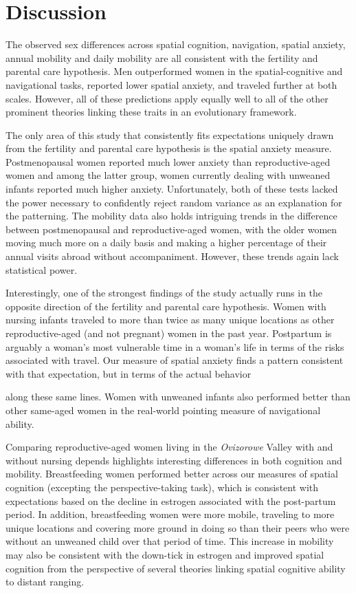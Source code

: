 \section{Discussion}
\label{sec:4}

The observed sex differences across spatial cognition, navigation, spatial anxiety, annual mobility and daily mobility are all consistent with the fertility and parental care hypothesis.  Men outperformed women in the spatial-cognitive and navigational tasks, reported lower spatial anxiety, and traveled further at both scales.  However, all of these predictions apply equally well to all of the other prominent theories linking these traits in an evolutionary framework.  

The only area of this study that consistently fits expectations uniquely drawn from the fertility and parental care hypothesis is the spatial anxiety measure.  Postmenopausal women reported much lower anxiety than reproductive-aged women and among the latter group, women currently dealing with unweaned infants reported much higher anxiety.  Unfortunately, both of these tests lacked the power necessary to confidently reject random variance as an explanation for the patterning.  The mobility data also holds intriguing trends in the difference between postmenopausal and reproductive-aged women, with the older women moving much more on a daily basis and making a higher percentage of their annual visits abroad without accompaniment.  However, these trends again lack statistical power.

Interestingly, one of the strongest findings of the study actually runs in the opposite direction of the fertility and parental care hypothesis.  Women with nursing infants traveled to more than twice as many unique locations as other reproductive-aged (and not pregnant) women in the past year.  Postpartum is arguably a woman's most vulnerable time in a woman's life in terms of the risks associated with travel.  Our measure of spatial anxiety finds a pattern consistent with that expectation, but in terms of the actual behavior   

along these same lines.  Women with unweaned infants also performed better than other same-aged women in the real-world pointing measure of navigational ability.

Comparing reproductive-aged women living in the \emph{Ovizorowe} Valley with and without nursing depends highlights interesting differences in both cognition and mobility.  Breastfeeding women performed better across our measures of spatial cognition (excepting the perspective-taking task), which is consistent with expectations based on the decline in estrogen associated with the post-partum period.  In addition, breastfeeding women were more mobile, traveling to more unique locations and covering more ground in doing so than their peers who were without an unweaned child over that period of time.  This increase in mobility may also be consistent with the down-tick in estrogen and improved spatial cognition from the perspective of several theories linking spatial cognitive ability to distant ranging.  

